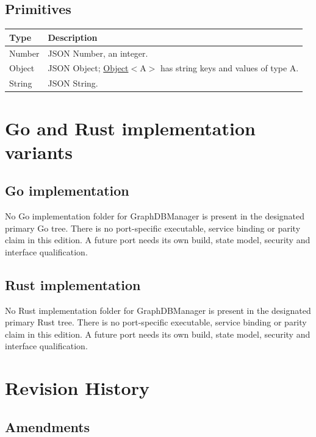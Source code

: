 \documentclass[a4paper]{arrowhead}
\newcommand{\pdef}[1]{{\textcolor{ArrowheadGrey}{#1 \label{sec:model:primitives:#1} \label{sec:model:primitives:#1s}}}}
\newcommand{\pref}[1]{{\textcolor{ArrowheadGrey}{\hyperref[sec:model:primitives:#1]{#1}}}}
\begin{document}
\subsection{Primitives}
\label{sec:model:primitives}

\noindent\begin{tabularx}{\textwidth}{| p{3cm} | X |} \hline
\rowcolor{gray!33} Type & Description \\ \hline
\pdef{Number} & JSON Number, an integer. \\ \hline
\pdef{Object} & JSON Object; \pref{Object}$<$A$>$ has string keys and values of type A. \\ \hline
\pdef{String} & JSON String. \\ \hline
\end{tabularx}

\newpage

\section{Go and Rust implementation variants}
\subsection{Go implementation}
No Go implementation folder for GraphDBManager is present in the designated primary Go tree. There is no port-specific executable, service binding or parity claim in this edition. A future port needs its own build, state model, security and interface qualification.
\subsection{Rust implementation}
No Rust implementation folder for GraphDBManager is present in the designated primary Rust tree. There is no port-specific executable, service binding or parity claim in this edition. A future port needs its own build, state model, security and interface qualification.




\newpage

\section{Revision History}
\subsection{Amendments}
\end{document}
